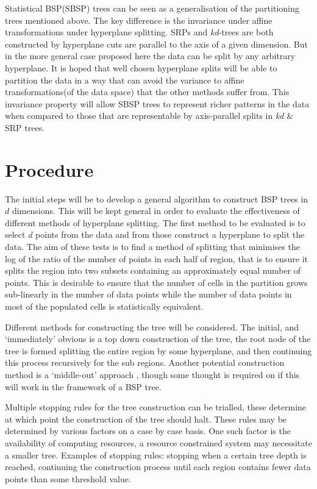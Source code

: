 \documentclass[a4paper, 10pt]{report} %
\begin{document}
Statistical BSP(SBSP) trees can be seen as a generalisation of the partitioning trees mentioned above. The key difference is the invariance under affine transformations under hyperplane splitting. SRPs and \textit{kd}-trees are both constructed by hyperplane cuts are parallel to the axis of a given dimension. But in the more general case proposed here the data can be split by any arbitrary hyperplane. It is hoped that well chosen hyperplane splits will be able to partition the data in a way that can avoid the variance to affine transformations(of the data space) that the other methods suffer from.
This invariance property will allow SBSP trees to represent richer patterns in the data when compared to those that are representable by axis-parallel splits in \textit{kd} \& SRP trees.



\section*{Procedure}

The initial steps will be to develop a general algorithm to construct BSP trees in $d$ dimensions. This will be kept general in order to evaluate the effectiveness of different methods of hyperplane splitting. The first method to be evaluated is to select $d$ points from the data and from those construct a hyperplane to split the data. The aim of these tests is to find a method of splitting that minimises the log of the ratio of the number of points in each half of region, that is to ensure it splits the region into two subsets containing an approximately equal number of points. This is desirable to ensure that the number of cells in the partition grows sub-linearly in the number of data points while the number of data points in most of the populated cells is statistically equivalent.

Different methods for constructing the tree will be considered. The initial, and `immediately' obvious is a top down construction of the tree, the root node of the tree is formed splitting the entire region by some hyperplane, and then continuing this process recursively for the sub regions. Another potential construction method is a `middle-out' approach \cite{Moore00theanchors}, though some thought is required on if this will work in the framework of a BSP tree.

Multiple stopping rules for the tree construction can be trialled, these determine at which point the construction of the tree should halt. These rules may be determined by various factors on a case by case basis. One such factor is the availability of computing resources, a resource constrained system may necessitate a smaller tree. Examples of stopping rules: stopping when a certain tree depth is reached, continuing the construction process until each region contains fewer data points than some threshold value.
\end{document}
